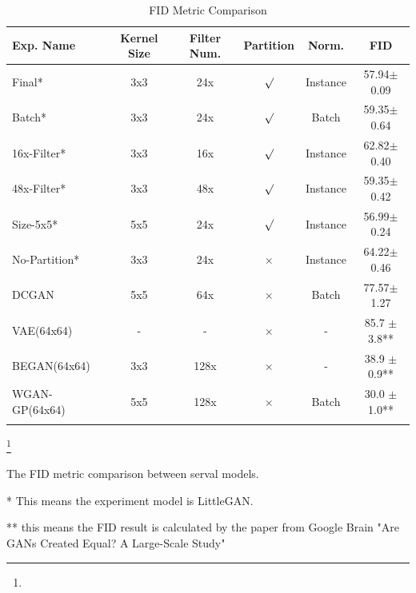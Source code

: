 \begin{table}
    \centering
    \caption{FID Metric Comparison}
    \label{result_fid}
    \begin{threeparttable}
    \begin{tabular}{l|ccccc}
        \hline
        Exp. Name    & Kernel Size & Filter Num.   & Partition          & Norm.         & FID            \\ \hline
        Final*        & 3x3         & 24x           & $\surd$            & Instance      & 57.94$\pm$0.09 \\
        Batch*        & 3x3         & 24x           & $\surd$            & Batch         & 59.35$\pm$0.64 \\
        16x-Filter*   & 3x3         & 16x           & $\surd$            & Instance      & 62.82$\pm$0.40 \\
        48x-Filter*   & 3x3         & 48x           & $\surd$            & Instance      & 59.35$\pm$0.42 \\
        Size-5x5*     & 5x5         & 24x           & $\surd$            & Instance      & 56.99$\pm$0.24 \\
        No-Partition* & 3x3         & 24x           & $\times$           & Instance      & 64.22$\pm$0.46 \\ \hline
        DCGAN        & 5x5         & 64x           & $\times$           & Batch         & 77.57$\pm$1.27 \\ \hline
        VAE(64x64)   & -           & -             & $\times$           & -             & 85.7 $\pm$3.8**  \\
        BEGAN(64x64) & 3x3         & 128x          & $\times$           & -             & 38.9 $\pm$0.9**  \\
        WGAN-GP(64x64) & 5x5       & 128x          & $\times$           & Batch         & 30.0 $\pm$1.0**  \\ \lasthline
    \end{tabular}
    
    \footnote{}
    \begin{tablenotes}
        \item The FID metric comparison between serval models.
        \item[*] This means the experiment model is LittleGAN.
        \item[**] this means the FID result is calculated by the paper from Google Brain "Are GANs Created Equal? A Large-Scale Study" 
    \end{tablenotes}
\end{threeparttable}
\end{table}


